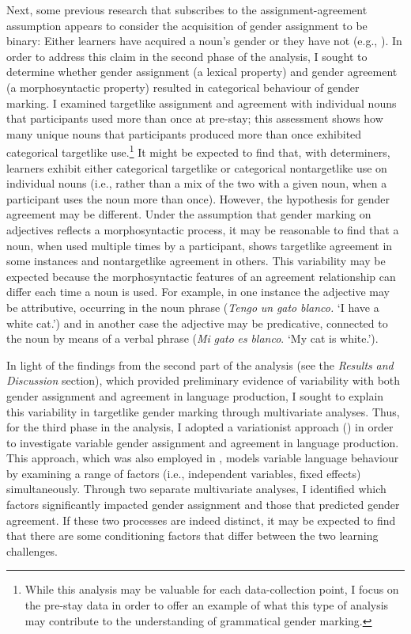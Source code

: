 \documentclass[output=paper,colorlinks,citecolor=brown,modfonts,nonflat]{../langscibook}
\begin{document}
Next, some previous research that subscribes to the assignment-agreement assumption appears to consider the acquisition of gender assignment to be binary: Either learners have acquired a noun’s gender or they have not (e.g., \citealt{Alarcón2010}). In order to address this claim in the second phase of the analysis, I sought to determine whether gender assignment (a lexical property) and gender agreement (a morphosyntactic property) resulted in categorical behaviour of gender marking. I examined targetlike assignment and agreement with individual nouns that participants used more than once at pre-stay; this assessment shows how many unique nouns that participants produced more than once exhibited categorical targetlike use.\footnote{{While this analysis may be valuable for each data-collection point, I focus on the pre-stay data in order to offer an example of what this type of analysis may contribute to the understanding of grammatical gender marking.}} It might be expected to find that, with determiners, learners exhibit either categorical targetlike or categorical nontargetlike use on individual nouns (i.e., rather than a mix of the two with a given noun, when a participant uses the noun more than once). However, the hypothesis for gender agreement may be different. Under the assumption that gender marking on adjectives reflects a morphosyntactic process, it may be reasonable to find that a noun, when used multiple times by a participant, shows targetlike agreement in some instances and nontargetlike agreement in others. This variability may be expected because the morphosyntactic features of an agreement relationship can differ each time a noun is used. For example, in one instance the adjective may be attributive, occurring in the noun phrase (\textit{Tengo} \textit{un} \textit{gato} \textit{blanco.} ‘I have a white cat.’) and in another case the adjective may be predicative, connected to the noun by means of a verbal phrase (\textit{Mi} \textit{gato} \textit{es} \textit{blanco}. ‘My cat is white.’).



In light of the findings from the second part of the analysis (see the \textit{Results} \textit{and} \textit{Discussion} section), which provided preliminary evidence of variability with both gender assignment and agreement in language production, I sought to explain this variability in targetlike gender marking through multivariate analyses. Thus, for the third phase in the analysis, I adopted a variationist approach (\citealt{GeeslinLong2014}) in order to investigate variable gender assignment and agreement in language production. This approach, which was also employed in \citet{GudmestadEtAl2019}, models variable language behaviour by examining a range of factors (i.e., independent variables, fixed effects) simultaneously. Through two separate multivariate analyses, I identified which factors significantly impacted gender assignment and those that predicted gender agreement. If these two processes are indeed distinct, it may be expected to find that there are some conditioning factors that differ between the two learning challenges. 
\end{document}
